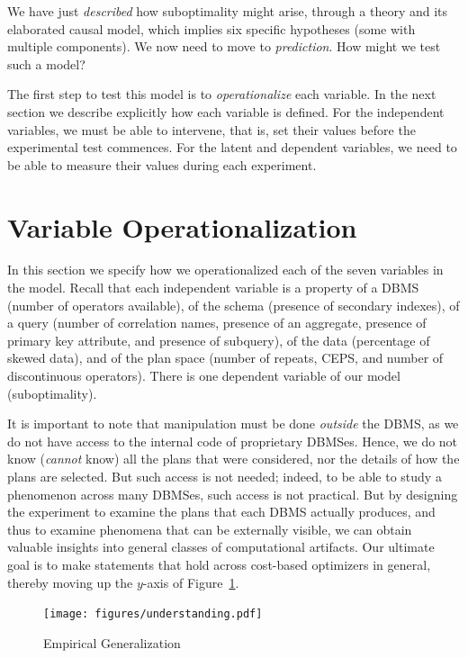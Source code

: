 \documentclass[prodmode,acmtods]{acmsmall}
\begin{document}
\vspace{0.6em}
We have just {\em described} how
suboptimality might arise, through a theory and its elaborated causal model,
which implies six specific hypotheses (some with multiple components).
We now need to move to {\em prediction}.
How might we test such a model? 

The first step to test this model is to {\em operationalize} each
variable. In the next section we describe explicitly how each variable is
defined. For the independent variables, we must be able to intervene, that is,
set their values before the experimental test commences. For the latent and
dependent variables, we need to be able to measure their values during each experiment.

\section{Variable Operationalization}\label{sec:operationalization}

In this section we specify how we operationalized each of the seven
variables in the model.  Recall that each independent variable is a property
of a \hbox{DBMS} (number of operators available), of the schema (presence
  of secondary indexes), of a query (number of correlation names,
presence of an aggregate, presence of primary key attribute, and
presence of subquery), of the data (percentage of skewed data), and of
the plan space (number of repeats, CEPS, and number of discontinuous
operators). There is 
one dependent variable of our model (suboptimality).

It is important to note that manipulation must be done {\em
  outside} the \hbox{DBMS}, as we do not have access to the
internal code of proprietary DBMSes. Hence, we do not know ({\em cannot} know) all the plans that were
considered, nor the details of how the plans are selected. But such access
is not needed; indeed, to be able to study a phenomenon across many \hbox{DBMSes},
such access is not practical. But by designing the experiment to examine
the plans that each \hbox{DBMS} actually produces, and thus to examine phenomena
that can be externally visible, we can obtain valuable insights into general
classes of computational artifacts. Our ultimate goal is to make statements
that hold across cost-based optimizers in general, thereby moving up the
$y$-axis of Figure~\ref{fig:empirical}.

\begin{figure}[t]
\centering
\texttt{[image: figures/understanding.pdf]}%
\caption{Empirical Generalization\label{fig:empirical}}
\end{figure}
\end{document}
